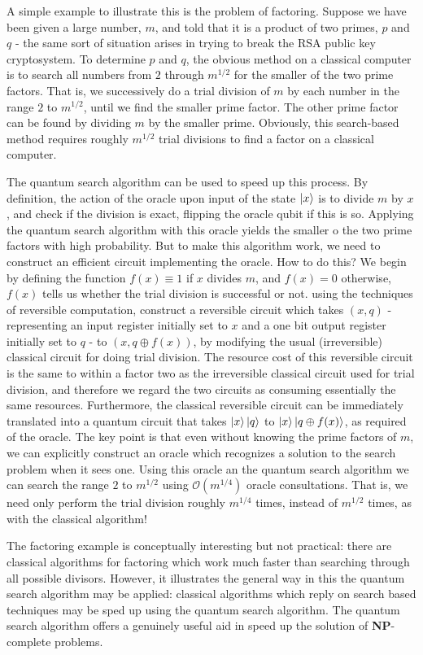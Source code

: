 \begin{importantnote}
A simple example to illustrate this is the problem of factoring. Suppose we have been given a large number, $m$, and told that it is a product of two primes, $p$ and $q$ - the same sort of situation arises in trying to break the RSA public key cryptosystem. To determine $p$ and $q$, the obvious method on a classical computer is to search all numbers from $2$ through $m^{1/2}$ for the smaller of the two prime factors. That is, we successively do a trial division of $m$ by each number in the range $2$ to $m^{1/2}$, until we find the smaller prime factor. The other prime factor can be found by dividing $m$ by the smaller prime. Obviously, this search-based method requires roughly $m^{1/2}$ trial divisions to find a factor on a classical computer. 

The quantum search algorithm can be used to speed up this process. By definition, the action of the oracle upon input of the state $\ket{x}$ is to divide $m$ by $x$, and check if the division is exact, flipping the oracle qubit if this is so. Applying the quantum search algorithm with this oracle yields the smaller o the two prime factors with high probability. But to make this algorithm work, we need to construct an efficient circuit implementing the oracle. How to do this? We begin by defining the function $f(x)\equiv 1$ if $x$ divides $m$, and $f(x)=0$ otherwise, $f(x)$ tells us whether the trial division is successful or not. using the techniques of reversible computation, construct a reversible circuit which takes $(x,q)$ - representing an input register initially set to $x$ and a one bit output register initially set to $q$ - to $(x,q\oplus f(x))$, by modifying the usual (irreversible) classical circuit for doing trial division. The resource cost of this reversible circuit is the same to within a factor two as the irreversible classical circuit used for trial division, and therefore we regard the two circuits as consuming essentially the same resources. Furthermore, the classical reversible circuit can be immediately translated into a quantum circuit that takes $\ket{x}\ket{q}$ to $\ket{x}\ket{q \oplus f(x)}$, as required of the oracle. The key point is that even without knowing the prime factors of $m$, we can explicitly construct an oracle which recognizes a solution to the search problem when it sees one. Using this oracle an the quantum search algorithm we can search the range $2$ to $m^{1/2}$ using $\mathcal{O}(m^{1/4})$ oracle consultations. That is, we need only perform the trial division roughly $m^{1/4}$ times, instead of $m^{1/2}$ times, as with the classical algorithm!

The factoring example is conceptually interesting but not practical: there are classical algorithms for factoring which work much faster than searching through all possible divisors. However, it illustrates the general way in this the quantum search algorithm may be applied: classical algorithms which reply on search based techniques may be sped up using the quantum search algorithm. The quantum search algorithm offers a genuinely useful aid in speed up the solution of \textbf{NP}-complete problems.
\end{importantnote}

